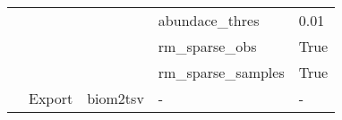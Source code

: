\begin{table}[]
{\begin{tabular}{|l|l|l|l|l|}
                                          &                                                           &                                        & abundace\_thres                        & 0.01                                                           \\ \cline{4-5}
                                          &                                                           &                                        & rm\_sparse\_obs                        & True                                                           \\ \cline{4-5}
                                          &                                                           &                                        & rm\_sparse\_samples                    & True                                                           \\ \cline{2-5}
                                          & Export                                                    & biom2tsv                               & -                                      & -                                                              \\ \hline
\end{tabular}}
\end{table}
